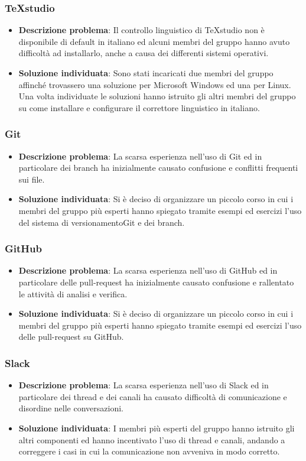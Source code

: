 	\subsubsection{TeXstudio}
		\begin{itemize}
			\item \textbf{Descrizione problema}: Il controllo linguistico di TeXstudio non è disponibile di default in italiano ed alcuni membri del gruppo hanno avuto difficoltà ad installarlo, anche a causa dei differenti sistemi operativi.
			\item \textbf{Soluzione individuata}: Sono stati incaricati due membri del gruppo affinché trovassero una soluzione per Microsoft Windows ed una per Linux. Una volta individuate le soluzioni hanno istruito gli altri membri del gruppo su come installare e configurare il correttore linguistico in italiano.
		\end{itemize}
	\subsubsection{Git}
		\begin{itemize}
			\item \textbf{Descrizione problema}: La scarsa esperienza nell'uso di Git ed in particolare dei branch ha inizialmente causato confusione e conflitti frequenti sui file.
			\item \textbf{Soluzione individuata}: Si è deciso di organizzare un piccolo corso in cui i membri del gruppo più esperti hanno spiegato tramite esempi ed esercizi l'uso del sistema di versionamento\glosp Git e dei branch. 
		\end{itemize}
	\subsubsection{GitHub}
		\begin{itemize}
		\item \textbf{Descrizione problema}: La scarsa esperienza nell'uso di GitHub ed in particolare delle pull-request ha inizialmente causato confusione e rallentato le attività di analisi e verifica.
		\item \textbf{Soluzione individuata}: Si è deciso di organizzare un piccolo corso in cui i membri del gruppo più esperti hanno spiegato tramite esempi ed esercizi l'uso delle pull-request su GitHub. 
		\end{itemize}
	\subsubsection{Slack}
		\begin{itemize}
			\item \textbf{Descrizione problema}: La scarsa esperienza nell'uso di Slack ed in particolare dei thread e dei canali ha causato difficoltà di comunicazione e disordine nelle conversazioni.
			\item \textbf{Soluzione individuata}: I membri più esperti del gruppo hanno istruito gli altri componenti ed hanno incentivato l'uso di thread e canali, andando a correggere i casi in cui la comunicazione non avveniva in modo corretto. 
		\end{itemize}